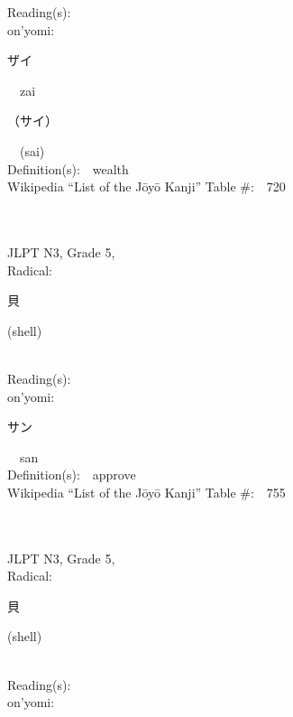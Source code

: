 \begin{multicols}{2}
Reading(s):\ \ \\
{\hspace*{1em}}on'yomi:\ \ \\
{\hspace*{2em}}{\begin{CJK}{UTF8}{min} ザイ \end{CJK}}\ \ zai\ \ \\
{\hspace*{2em}}{\begin{CJK}{UTF8}{min} （サイ） \end{CJK}}\ \ (sai)\ \ \\
Definition(s):\ \ wealth \\
Wikipedia ``List of the J\=oy\=o Kanji'' Table \#:\ \ 720 \\
\ \ \\
{\fontsize{34pt}{40pt}  }\ \ \\  %
{JLPT N3, Grade 5, \\Radical:\ \ {\begin{CJK}{UTF8}{min} 貝 \end{CJK}} (shell) } \\
Reading(s):\ \ \\
{\hspace*{1em}}on'yomi:\ \ \\
{\hspace*{2em}}{\begin{CJK}{UTF8}{min} サン \end{CJK}}\ \ san\ \ \\
Definition(s):\ \ approve \\
Wikipedia ``List of the J\=oy\=o Kanji'' Table \#:\ \ 755 \\
\ \ \\
{\fontsize{34pt}{40pt}  }\ \ \\  %
{JLPT N3, Grade 5, \\Radical:\ \ {\begin{CJK}{UTF8}{min} 貝 \end{CJK}} (shell) } \\
Reading(s):\ \ \\
{\hspace*{1em}}on'yomi:\ \ \\

\end{multicols}
